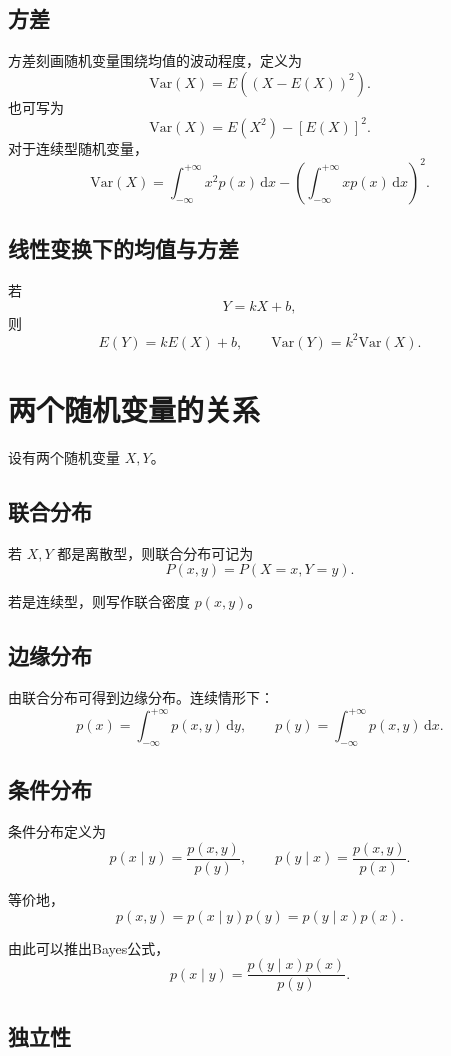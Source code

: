\subsection{方差}

方差刻画随机变量围绕均值的波动程度，定义为
\[
\mathrm{Var}(X)=E\left((X-E(X))^2\right).
\]
也可写为
\[
\mathrm{Var}(X)=E(X^2)-[E(X)]^2.
\]
对于连续型随机变量，
\[
\mathrm{Var}(X)=\int_{-\infty}^{+\infty} x^2p(x)\,\mathrm{d}x-\left(\int_{-\infty}^{+\infty} xp(x)\,\mathrm{d}x\right)^2.
\]

\subsection{线性变换下的均值与方差}

若
\[
Y=kX+b,
\]
则
\[
E(Y)=kE(X)+b,
\qquad
\mathrm{Var}(Y)=k^2\mathrm{Var}(X).
\]

\section{两个随机变量的关系}

设有两个随机变量 \(X,Y\)。

\subsection{联合分布}

若 \(X,Y\) 都是离散型，则联合分布可记为
\[
P(x,y)=P(X=x,Y=y).
\]

若是连续型，则写作联合密度 \(p(x,y)\)。

\subsection{边缘分布}

由联合分布可得到边缘分布。连续情形下：
\[
p(x)=\int_{-\infty}^{+\infty} p(x,y)\,\mathrm{d}y,
\qquad
p(y)=\int_{-\infty}^{+\infty} p(x,y)\,\mathrm{d}x.
\]

\subsection{条件分布}

条件分布定义为
\[
p(x\mid y)=\frac{p(x,y)}{p(y)},
\qquad
p(y\mid x)=\frac{p(x,y)}{p(x)}.
\]

等价地，
\[
p(x,y)=p(x\mid y)p(y)=p(y\mid x)p(x).
\]

由此可以推出Bayes公式，
\[
p(x\mid y) = \frac{p(y \mid x)p(x)}{p(y)}.
\]

\subsection{独立性}

